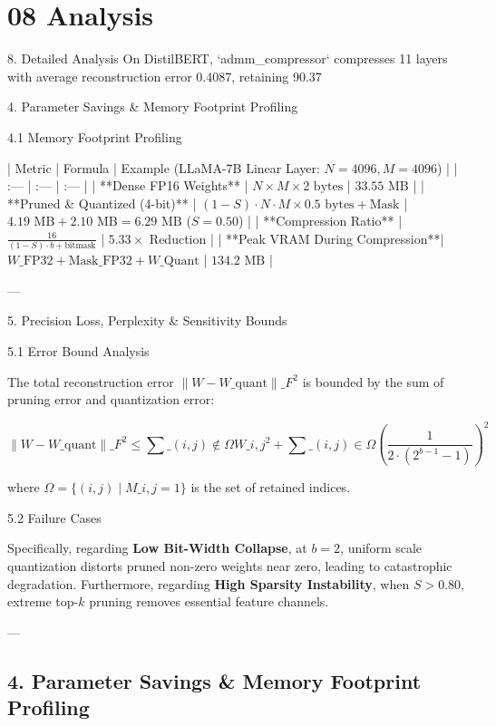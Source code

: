 \section{08 Analysis}

 8. Detailed Analysis
On DistilBERT, `admm\_compressor` compresses 11 layers with average reconstruction error 0.4087, retaining 90.37%


 4. Parameter Savings \& Memory Footprint Profiling


 4.1 Memory Footprint Profiling

| Metric | Formula | Example (LLaMA-7B Linear Layer: $N=4096, M=4096$) |
| :--- | :--- | :--- |
| **Dense FP16 Weights** | $N \times M \times 2 \text{ bytes}$ | $33.55 \text{ MB}$ |
| **Pruned \& Quantized (4-bit)** | $(1 - S) \cdot N \cdot M \times 0.5 \text{ bytes} + \text{Mask}$ | $4.19 \text{ MB} + 2.10 \text{ MB} = 6.29 \text{ MB}$ ($S=0.50$) |
| **Compression Ratio** | $\frac{16}{(1 - S) \cdot b + \text{bitmask}}$ | $\mathbf{5.33\times}$ Reduction |
| **Peak VRAM During Compression**| $W\_{\text{FP32}} + \text{Mask}\_{\text{FP32}} + W\_{\text{Quant}}$ | $134.2 \text{ MB}$ |

---


 5. Precision Loss, Perplexity \& Sensitivity Bounds


 5.1 Error Bound Analysis

The total reconstruction error $\| W - W\_{\text{quant}} \|\_F^2$ is bounded by the sum of pruning error and quantization error:

$$\| W - W\_{\text{quant}} \|\_F^2 \le \sum\_{(i,j) \notin \Omega} W\_{i,j}^2 + \sum\_{(i,j) \in \Omega} \left( \frac{1}{2 \cdot (2^{b-1} - 1)} \right)^2$$

where $\Omega = \{ (i,j) \mid M\_{i,j} = 1 \}$ is the set of retained indices.

 5.2 Failure Cases

Specifically, regarding \textbf{Low Bit-Width Collapse}, at $b=2$, uniform scale quantization distorts pruned non-zero weights near zero, leading to catastrophic degradation. Furthermore, regarding \textbf{High Sparsity Instability}, when $S > 0.80$, extreme top-$k$ pruning removes essential feature channels.


---



\subsection{4. Parameter Savings \& Memory Footprint Profiling}
